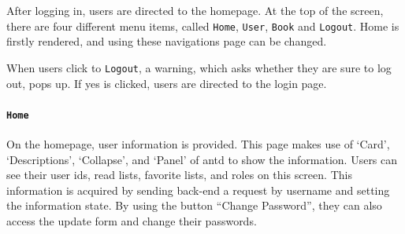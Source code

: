 After logging in, users are directed to the homepage. At the top of the screen, there are four different menu items, called \texttt{Home}, \texttt{User}, \texttt{Book} and \texttt{Logout}. Home is firstly rendered, and using these navigations page can be changed.

When users click to \texttt{Logout}, a warning, which asks whether they are sure to log out, pops up. If yes is clicked, users are directed to the login page.

\paragraph{\texttt{Home}}

On the homepage, user information is provided. This page makes use of `Card', `Descriptions', `Collapse', and `Panel' of antd to show the information. Users can see their user ids, read lists, favorite lists, and roles on this screen. This information is acquired by sending back-end a request by username and setting the information state. By using the button ``Change Password'', they can also access the update form and change their passwords.

